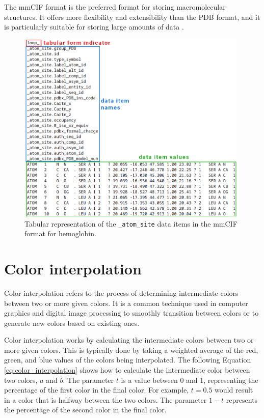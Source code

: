 \documentclass[
  digital,     %
  oneside,     %
  nosansbold,  %
  nocolorbold, %
  lof,         %
  lot,         %
]{fithesis4}
\begin{document}
The mmCIF format is the preferred format for storing macromolecular structures. It offers more flexibility and extensibility than the PDB format, and it is particularly suitable for storing large amounts of data \cite{}.

\begin{figure}[htbp]
  \begin{center}
    \includegraphics[width=11cm]{figures/3bj1_mmcif.png}
  \end{center}
  \caption{Tabular representation of the \texttt{\_atom\_site} data items in the mmCIF format for hemoglobin.}
  \label{fig:mmcif}
\end{figure}

\section {Color interpolation}
\label{section:color_interpolation}


Color interpolation refers to the process of determining intermediate colors between two or more given colors. It is a common technique used in computer graphics and digital image processing to smoothly transition between colors or to generate new colors based on existing ones. \cite{zucconi2016secrets}

Color interpolation works by calculating the intermediate colors between two or more given colors. This is typically done by taking a weighted average of the red, green, and blue values of the colors being interpolated. The following Equation \ref{eq:color_interpolation} shows how to calculate the intermediate color between two colors, $a$ and $b$. The parameter $t$ is a value between 0 and 1, representing the percentage of the first color in the final color. For example, $t = 0.5$ would result in a color that is halfway between the two colors. The parameter $1 - t$ represents the percentage of the second color in the final color.
\end{document}
